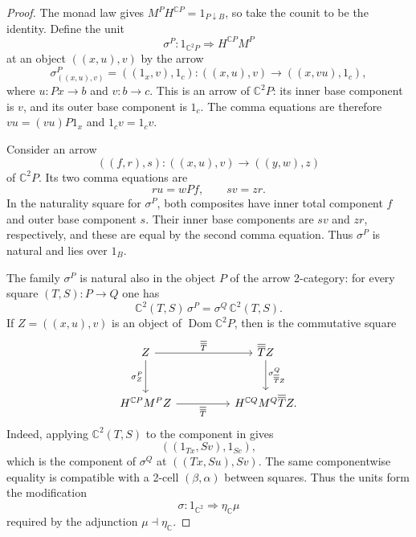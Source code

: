 \documentclass[11pt]{article}
\theoremstyle{plain}
\theoremstyle{definition}
\theoremstyle{remark}
\newcommand{\Dom}{\operatorname{Dom}}
\newcommand{\C}{\mathbb{C}}
\numberwithin{equation}{section}
\begin{document}
\begin{proof}
The monad law gives
$M^{P}H^{\C P}=1_{P\downarrow B}$, so take the counit to be the
identity.  Define the unit
\begin{equation*}
\sigma^{P}\colon1_{\C^2P}\Longrightarrow
  H^{\C P}M^{P}
\end{equation*}
at an object $((x,u),v)$ by the arrow
\begin{equation}
\sigma^{P}_{((x,u),v)}=((1_x,v),1_c)
  \colon((x,u),v)\longrightarrow((x,vu),1_c),
  \label{eq:kz-unit}
\end{equation}
where $u\colon Px\to b$ and $v\colon b\to c$.  This is an arrow of
$\C^2P$: its inner base component is $v$, and its outer base component
is $1_c$.  The comma equations are therefore
$vu=(vu)P1_x$ and $1_cv=1_cv$.

Consider an arrow
\begin{equation*}
  ((f,r),s)\colon((x,u),v)\longrightarrow((y,w),z)
\end{equation*}
of $\C^2P$.  Its two comma equations are
\begin{equation*}
  ru=wPf,
  \qquad
  sv=zr.
\end{equation*}
In the naturality square for $\sigma^{P}$, both composites have inner
total component $f$ and outer base component $s$.  Their inner base
components are $sv$ and $zr$, respectively, and these are equal by the
second comma equation.  Thus $\sigma^{P}$ is natural and lies over
$1_B$.

The family $\sigma^{P}$ is natural also in the object $P$ of the arrow
2-category: for every square $(T,S)\colon P\to Q$ one has
\begin{equation}
  \C^2(T,S)\,\sigma^P
  =\sigma^Q\,\C^2(T,S).
  \label{eq:kz-modification-naturality}
\end{equation}
If $Z=((x,u),v)$ is an object of $\Dom\C^2P$, then
 is the commutative square
\begin{equation*}
\begin{tikzcd}[column sep=huge,row sep=large]
Z \arrow[r,"{\overline{\overline T}}"]
  \arrow[d,"{\sigma^P_Z}"']
& \overline{\overline T}Z
  \arrow[d,"{\sigma^Q_{\overline{\overline T}Z}}"] \\
H^{\C P}M^PZ
  \arrow[r,"{\overline{\overline T}}"']
& H^{\C Q}M^Q\overline{\overline T}Z .
\end{tikzcd}
\end{equation*}
Indeed, applying $\C^2(T,S)$ to the component in
 gives
\begin{equation*}
  ((1_{Tx},Sv),1_{Sc}),
\end{equation*}
which is the component of $\sigma^{Q}$ at
$((Tx,Su),Sv)$.  The same componentwise equality is compatible with a
2-cell $(\beta,\alpha)$ between squares.  Thus the units form the
modification
\begin{equation*}
  \sigma\colon 1_{\C^{2}}\Longrightarrow\eta_{\C}\mu
\end{equation*}
required by the adjunction $\mu\dashv\eta_{\C}$.


\end{proof}
\end{document}
